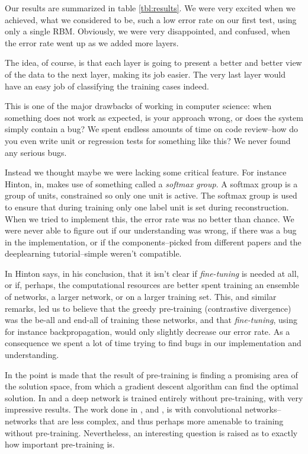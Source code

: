 \documentclass[11pt]{article}
\begin{document}
Our results are summarized in table \ref{tbl:results}.  We were very excited when we achieved, what we considered to be, such a low error rate on our first test, using only a single RBM.  Obviously, we were very disappointed, and confused, when the error rate went up as we added more layers.

The idea, of course, is that each layer is going to present a better and better view of the data to the next layer, making its job easier.  The very last layer would have an easy job of classifying the training cases indeed.

This is one of the major drawbacks of working in computer science: when something does not work as expected, is your approach wrong, or does the system simply contain a bug?  We spent endless amounts of time on code review--how do you even write unit or regression tests for something like this? We never found any serious bugs.

Instead we thought maybe we were lacking some critical feature. For instance Hinton, in\cite{hinton06}, makes use of something called a \textit{softmax group}.  A softmax group is a group of units, constrained so only one unit is active.  The softmax group is used to ensure that during training only one label unit is set during reconstruction.  When we tried to implement this, the error rate was no better than chance.  We were never able to figure out if our understanding was wrong, if there was a bug in the implementation, or if the components--picked from different papers and the deeplearning tutorial--simple weren't compatible.

In \cite{hinton06} Hinton says, in his conclusion, that it isn't clear if \textit{fine-tuning} is needed at all, or if, perhaps, the computational resources are better spent training an ensemble of networks, a larger network, or on a larger training set.  This, and similar remarks, led us to believe that the greedy pre-training (contrastive divergence) was the be-all and end-all of training these networks, and that \textit{fine-tuning}, using for instance backpropagation, would only slightly decrease our error rate.  As a consequence we spent a lot of time trying to find bugs in our implementation and understanding.

In \cite{bengio07} the point is made that the result of pre-training is finding a promising area of the solution space, from which a gradient descent algorithm can find the optimal solution.  In \cite{ciresan} and \cite{ciresan2} a deep network is trained entirely without pre-training, with very impressive results.  The work done in \cite{ciresan}, and \cite{ciresan2}, is with convolutional networks--networks that are less complex, and thus perhaps more amenable to training without pre-training. Nevertheless, an interesting question is raised as to exactly how important pre-training is.
\end{document}
